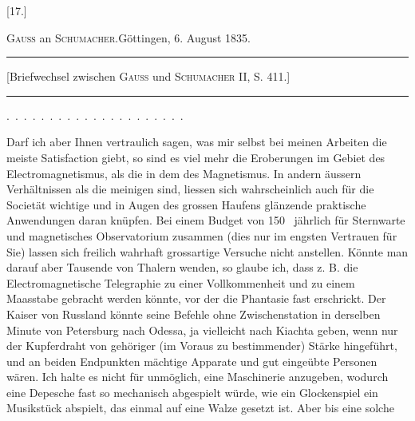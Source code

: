 \clearpage\begingroup{}

\begin{center}[17.]\end{center}
\begin{center}\textsc{Gauss} an \textsc{Schumacher}.\quad Göttingen, 6. August 1835.\end{center}
\begin{center}\begin{minipage}{.82\linewidth}\centering\hrule\vspace{3pt}
\small [Briefwechsel zwischen \textsc{Gauss} und \textsc{Schumacher} II, S. 411.]
\par\vspace{3pt}\hrule\end{minipage}\end{center}
\noindent .\ .\ .\ .\ .\ .\ .\ .\ .\ .\ .\ .\ .\ .\ .\ .\ .\ .\ .\ .\ .\par
\indent Darf ich aber Ihnen vertraulich sagen, was mir selbst bei meinen Arbeiten
die meiste Satisfaction giebt, so sind es viel mehr die 
Eroberungen im Gebiet des Electromagnetismus, als die in dem des 
Magnetismus. In andern äussern Verhältnissen als die meinigen sind, liessen
sich wahrscheinlich auch für die Societät wichtige und in Augen des grossen
Haufens glänzende praktische Anwendungen daran knüpfen. Bei einem Budget
von 150 \HistoricalCurrencyLSeventeen\ jährlich für Sternwarte und magnetisches Observatorium zusammen
(dies nur im engsten Vertrauen für Sie) lassen sich freilich wahrhaft
grossartige Versuche nicht anstellen. Könnte man darauf aber Tausende von
Thalern wenden, so glaube ich, dass z. B. die Electromagnetische Telegraphie
zu einer Vollkommenheit und zu einem Maasstabe gebracht werden könnte,
vor der die Phantasie fast erschrickt. Der Kaiser von Russland könnte seine
Befehle ohne Zwischenstation in derselben Minute von Petersburg nach Odessa,
ja vielleicht nach Kiachta geben, wenn nur der Kupferdraht von gehöriger
\clearpage{}
\noindent (im Voraus  zu bestimmender) Stärke  hingeführt, und an
beiden Endpunkten mächtige Apparate und gut eingeübte Personen wären.
Ich halte es nicht für unmöglich, eine Maschinerie anzugeben, wodurch eine
Depesche fast so mechanisch abgespielt würde, wie ein Glockenspiel ein Musikstück
abspielt, das einmal auf eine Walze gesetzt ist. Aber bis eine solche
